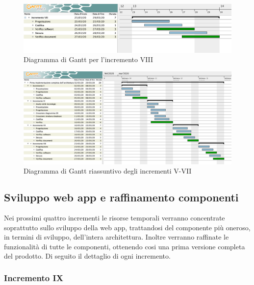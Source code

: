 		\begin{landscape}
          \begin{figure}[H]
            \centering
            \includegraphics[width=\linewidth]{images/gantt/incrementoVIII} %
            \caption{Diagramma di Gantt per l'incremento VIII}
          \end{figure}		
		\end{landscape}
	
		
		\begin{landscape}
			\begin{figure}[H]
				\centering
				\includegraphics[width=\linewidth]{images/gantt/incrementi-V-VIII} %
				\caption{Diagramma di Gantt riassuntivo degli incrementi V-VII}
			\end{figure}		
		\end{landscape}

		\subsection{Sviluppo web app e raffinamento componenti}
		Nei prossimi quattro incrementi le risorse temporali verranno concentrate soprattutto sullo sviluppo della web app, trattandosi del componente più oneroso, in termini di sviluppo, dell'intera architettura. Inoltre verranno raffinate le funzionalità di tutte le componenti, ottenendo cosi una prima versione completa del prodotto.
		Di seguito il dettaglio di ogni incremento.

		\subsubsection{Incremento IX}
			

